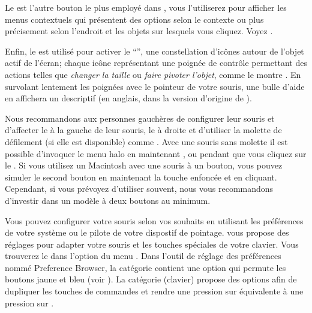 \documentclass[a4paper,10pt,twoside]{book}
\begin{document}
Le  est l'autre bouton le plus employé dans \sq, vous l'utiliserez pour afficher les menus contextuels qui présentent des options selon le contexte ou plus précisement selon l'endroit et les objets sur lesquels vous cliquez. Voyez .



Enfin, le  est utilisé pour activer le
``'', une constellation d'ic\^ones autour de l'objet
actif de l'écran; chaque ic\^one repr\'esentant une poign\'ee de contr\^ole
permettant des actions telles que \emph{changer la taille} ou
\emph{faire pivoter l'objet}, comme le montre .
En survolant lentement les poignées avec le pointeur de votre souris,
une bulle d'aide en affichera un descriptif
(en anglais, dans la version d'origine de \sq).


Nous recommandons aux personnes gauchères de configurer leur souris et d'affecter le  à la gauche de leur souris, le  à droite et d'utiliser la molette de défilement (si elle est disponible) comme .
Avec une souris sans molette il est possible d'invoquer le menu halo
en maintenant , 
ou  pendant que vous cliquez sur le .
Si vous utilisez un Macintosh avec une souris à un bouton, vous pouvez
simuler le second bouton en maintenant la touche \clover{} enfoncée et
en cliquant. Cependant, si vous prévoyez d'utiliser \sq souvent, nous
vous recommandons d'investir dans un modèle à deux boutons au minimum.

Vous pouvez configurer votre souris selon vos souhaits en utilisant les préférences de votre système ou le pilote de votre dispostif de pointage.
\sq vous propose des réglages pour adapter votre souris et les touches spéciales de votre clavier. Vous trouverez le  dans l'option  du menu .
Dans l'outil de r\'eglage des pr\'ef\'erences nomm\'e Preference
Browser, la catégorie  contient une option
 qui permute les boutons jaune et bleu (voir
). La cat\'egorie  (clavier)
propose des options afin de dupliquer les touches de commandes et 
rendre une pression sur  \'equivalente à une pression sur .
\end{document}
